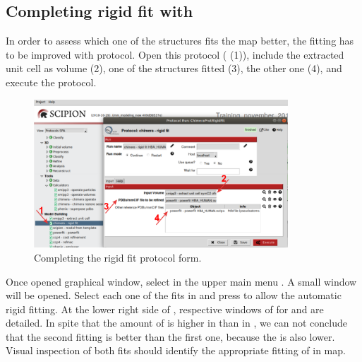 \subsection*{ Completing rigid fit with \chimera {}}
 
 In order to assess which one of the structures fits the map better, the fitting has to be improved with  protocol. Open this protocol ( (1)), include the extracted unit cell as volume (2), one of the structures fitted (3), the other one (4), and execute the protocol.
 
 \begin{figure}[H]
  \centering 
  \captionsetup{width=.7\linewidth} 
  \includegraphics[width=0.85\textwidth]{Images/Fig21}
  \caption{Completing the \chimera rigid fit protocol form.}
  \label{fig:chimera_rigid_fit}
  \end{figure}
  
  Once opened \chimera graphical window, select in the upper main menu . A small window will be opened. Select each one of the fits in  and press  to allow the automatic rigid fitting. At the lower right side of , respective windows of  for  and  are detailed. In spite that the amount of  is higher in  than in , we can not conclude that the second fitting is better than the first one, because the  is also lower. Visual inspection of both fits should identify the appropriate fitting of  in map.
  
